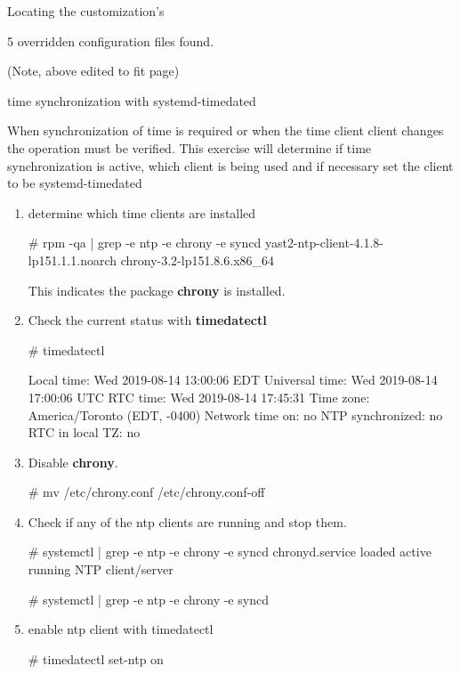 \begin{Lab}
\begin{exe}{Locating the customization's}
\begin{enumerate}
\begin{rawscriptsize}
5 overridden configuration files found.

			\end{rawscriptsize}
(Note, above edited to fit page) 
	\end{enumerate}



\end{exe}

\begin{exe}{time synchronization with systemd-timedated}

	When synchronization of time is required or when the time client
	client changes the operation must be verified. This exercise will determine
	if time synchronization is active, which client is being used and 
	if necessary 
	set the client to be systemd-timedated

	\begin{enumerate} 
	\item determine which time clients are installed
\begin{raw}
# rpm -qa | grep -e ntp -e chrony -e syncd
yast2-ntp-client-4.1.8-lp151.1.1.noarch
chrony-3.2-lp151.8.6.x86_64
\end{raw}
	This indicates the package \textbf{chrony} is installed. 

	\item 
	Check the current status with \textbf{timedatectl} 
	\begin{raw}
# timedatectl 

      Local time: Wed 2019-08-14 13:00:06 EDT
  Universal time: Wed 2019-08-14 17:00:06 UTC
        RTC time: Wed 2019-08-14 17:45:31
       Time zone: America/Toronto (EDT, -0400)
 Network time on: no
NTP synchronized: no
 RTC in local TZ: no

	\end{raw}
	
	\item

	Disable \textbf{chrony}.
	\begin{raw}
# mv /etc/chrony.conf  /etc/chrony.conf-off 
	\end{raw}

	\item Check if any of the ntp clients are running and stop them.
		\begin{raw}
# systemctl | grep -e ntp -e chrony -e syncd
chronyd.service    loaded active running   NTP client/server

# systemctl | grep -e ntp -e chrony -e syncd
		\end{raw}
		\item enable ntp client with timedatectl
		\begin{raw}
# timedatectl set-ntp on
		\end{raw}


\end{enumerate}
\end{exe}
\end{Lab}
